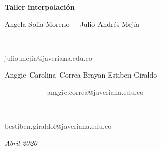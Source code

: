 \documentclass[12pt]{article}
\renewcommand{\_}{\kern-1.5pt\textunderscore\kern-1.5pt}
\begin{document}
\begin{Center}
{\fontsize{14pt}{16.8pt}\selectfont \textbf{Taller interpolación}\par}
\end{Center}\par

Angela Sofia Moreno\tab \tab \tab \tab \tab \ \ \  Julio Andrés Mejía\par

\tab {\fontsize{9pt}{10.8pt}\selectfont \textcolor[HTML]{484644}{moreno\_angela@javeriana.edu.co\par}}\ \ \ \ \ \ \ \ \ \ \ \ \ \ \ \ \ \ \ \ \ \ \ \ \ \ \ \ \ \ \ \ \ \ \ \ \ \ \ \ \ \ \ \  {\fontsize{9pt}{10.8pt}\selectfont \textcolor[HTML]{484644}{julio.mejia@javeriana.edu.co}\par}\par

Anggie\ Carolina\ Correa   \tab \tab \tab \tab Brayan Estiben Giraldo\par

{\fontsize{9pt}{10.8pt}\selectfont \textcolor[HTML]{484644}{\ \ \ \ \ \ \ \ \ \ \ \  anggie.correa@javeriana.edu.co\par}}\tab \ \ \ \ \ \ \ \ \ \ \ \ \ \ \ \ \ \ \ \ \ \ \ \ \ \ \ \ \ \ \ \ \ \ \ \ \  {\fontsize{9pt}{10.8pt}\selectfont \textcolor[HTML]{484644}{bestiben.giraldol@javeriana.edu.co}\par}\par

\begin{Center}
\textit{Abril 2020}
\end{Center}\par
\end{document}
